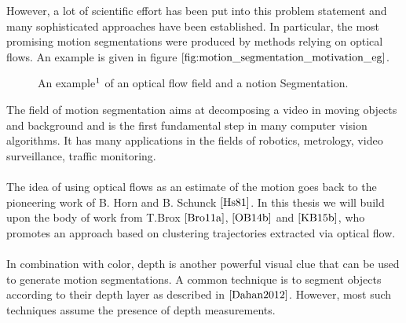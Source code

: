 However, a lot of scientific effort has been put into this problem statement and many sophisticated approaches have been established. In particular, the most promising motion segmentations were produced by methods relying on optical flows. An example is given in figure $\ref{fig:motion_segmentation_motivation_eg}$.
\begin{figure}[H]
\begin{center}
\end{center}
\caption[Motion Segmentation Motivation Example]{An example$\footnotemark$ of an optical flow field and a notion Segmentation. }
\label{fig:motion_segmentation_motivation_eg}
\end{figure}
The field of motion segmentation aims at decomposing a video in moving objects and background and is the first fundamental step in many computer vision algorithms. It has many applications in the fields of robotics, metrology, video surveillance, traffic monitoring. \\ \\
The idea of using optical flows as an estimate of the motion goes back to the pioneering work of B. Horn and B. Schunck $\cite{Hs81}$. In this thesis we will build upon the body of work from T.Brox $\cite{Bro11a}$, $\cite{OB14b}$ and $\cite{KB15b}$, who promotes an approach based on clustering trajectories extracted via optical flow. \\ \\
In combination with color, depth is another powerful visual clue that can be used to generate motion segmentations. A common technique is to segment objects according to their depth layer as described in $\cite{Dahan2012}$. However, most such techniques assume the presence of depth measurements. \\ \\
